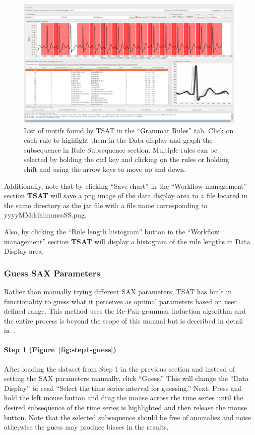 \documentclass[titlepage, letterpaper, 12pt]{article}
\newcommand\TSAT{\textbf{TSAT}}
\begin{document}
\begin{figure}[H]
	\centering
	\includegraphics[width=0.7\linewidth]{pictures/motifguide/step3-motifs}
	\caption{List of motifs found by TSAT in the ``Grammar Rules'' tab.  Click on each rule to highlight them in the Data display and graph the subsequence in Rule Subsequence section.  Multiple rules can be selected by holding the ctrl key and clicking on the rules or holding shift and using the arrow keys to move up and down.}
	\label{fig:step3-motifs}
\end{figure}

Additionally, note that by clicking ``Save chart'' in the ``Workflow management'' section {\TSAT} will save a png image of the data display area to a file located in the same directory as the jar file with a file name corresponding to yyyyMMddhhmmssSS.png.

Also, by clicking the ``Rule length histogram'' button in the ``Workflow management'' section {\TSAT} will display a histogram of the rule lengths in Data Display area.



\subsubsection{Guess SAX Parameters}

Rather than manually trying different SAX parameters, TSAT has built in functionality to guess what it perceives as optimal parameters based on user defined range.  This method uses the Re-Pair grammar induction algorithm and the entire process is beyond the scope of this manual but is described in detail in~\cite{paramSelection}.

\paragraph{Step 1 (Figure~\ref{fig:step1-guess})} After loading the dataset from Step 1 in the previous section and instead of setting the SAX parameters manually, click ``Guess.''  This will change the ``Data Display'' to read ``Select the time series interval for guessing.'' Next, Press and hold the left mouse button and drag the mouse across the time series until the desired subsequence of the time series is highlighted and then release the mouse button.  Note that the selected subsequence should be free of anomalies and noise otherwise the guess may produce biases in the results.
\end{document}
